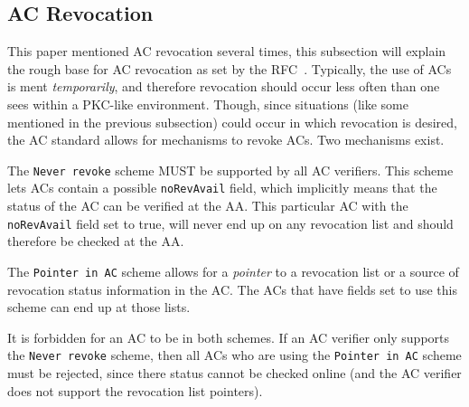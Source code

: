 \documentclass[10pt,conference,a4paper]{IEEEtran}
\begin{document}
\subsection{AC Revocation}
This paper mentioned AC revocation several times, this subsection will explain the rough base for AC revocation as set by the RFC~\cite{rfc_ac}. Typically, the use of ACs is ment \textit{temporarily}, and therefore revocation should occur less often than one sees within a PKC-like environment. Though, since situations (like some mentioned in the previous subsection) could occur in which revocation is desired, the AC standard allows for mechanisms to revoke ACs. Two mechanisms exist.

The \texttt{Never revoke} scheme MUST be supported by all AC verifiers. This scheme lets ACs contain a possible \texttt{noRevAvail} field, which implicitly means that the status of the AC can be verified at the AA. This particular AC with the \texttt{noRevAvail} field set to true, will never end up on any revocation list and should therefore be checked at the AA.

The \texttt{Pointer in AC} scheme allows for a \textit{pointer} to a revocation list or a source of revocation status information in the AC. The ACs that have fields set to use this scheme can end up at those lists.

It is forbidden for an AC to be in both schemes. If an AC verifier only supports the \texttt{Never revoke} scheme, then all ACs who are using the \texttt{Pointer in AC} scheme must be rejected, since there status cannot be checked online (and the AC verifier does not support the revocation list pointers).



\end{document}
